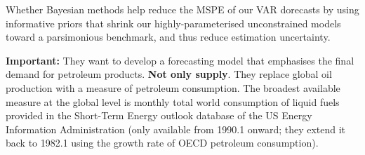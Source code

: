 Whether Bayesian methods help reduce the MSPE of our VAR dorecasts by using informative priors that shrink our highly-parameterised unconstrained models toward a parsimonious benchmark, and thus reduce estimation uncertainty.

\textbf{Important:} They want to develop a forecasting model that emphasises the final demand for petroleum products. \textbf{Not only supply}. They replace global oil production with a measure of petroleum consumption. The broadest available measure at the global level is monthly total world consumption of liquid fuels provided in the Short-Term Energy outlook database of the US Energy Information Administration (only available from 1990.1 onward; they extend it back to 1982.1 using the growth rate of OECD petroleum consumption).